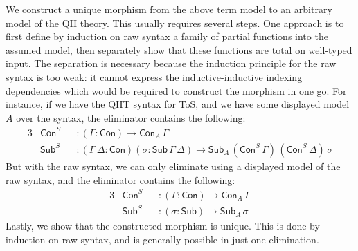 \documentclass[12pt,a4paper,twoside,openany]{book}
\theoremstyle{remark}
\theoremstyle{definition}
\theoremstyle{theorem}
\newcommand{\Con}{\mathsf{Con}}
\newcommand{\Sub}{\mathsf{Sub}}
\begin{document}
\begin{enumerate}
    We construct a unique morphism from the above term model to an arbitrary
    model of the QII theory. This usually requires several steps. One approach
    is to first define by induction on raw syntax a family of partial
    functions into the assumed model, then separately show that these functions
    are total on well-typed input. The separation is necessary because the
    induction principle for the raw syntax is too weak: it cannot express
    the inductive-inductive indexing dependencies which would be required to
    construct the morphism in one go. For instance, if we have the QIIT syntax
    for ToS, and we have some displayed model $A$ over the syntax, the
    eliminator contains the following:
    \begin{alignat*}{3}
      &\Con^S &&: (\Gamma : \Con) \to \Con_A\,\Gamma \\
      &\Sub^S &&: (\Gamma\,\Delta : \Con)(\sigma : \Sub\,\Gamma\,\Delta) \to \Sub_{A}\,(\Con^S\,\Gamma)\,(\Con^S\,\Delta)\,\sigma
    \end{alignat*}
    But with the raw syntax, we can only eliminate using a displayed model of
    the raw syntax, and the eliminator contains the following:
    \begin{alignat*}{3}
      &\Con^S &&: (\Gamma : \Con) \to \Con_A\,\Gamma \\
      &\Sub^S &&: (\sigma : \Sub) \to \Sub_A\,\sigma
    \end{alignat*}
    Lastly, we show that the constructed morphism is unique. This is done by
    induction on raw syntax, and is generally possible in just one elimination.
\end{enumerate}
\end{document}
